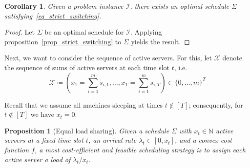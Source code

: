 \documentclass[hidelinks]{article}
\theoremstyle{plain}
\newtheorem{prop}[thm]{Proposition}
\newtheorem{cor}[thm]{Corollary}
\theoremstyle{definition}
\theoremstyle{rem}
\newcommand{\mx}{\mathcal{X}}
\newcommand{\inp}{\mathcal{I}}
\newcommand{\fromto}[2]{\{#1,\ldots,#2\}}
\begin{document}
\begin{cor}
Given a problem instance $\inp$, there exists an optimal schedule $\Sigma$ satisfying~\eqref{eq_strict_switching}.
\end{cor}

\begin{proof}
	Let $\Sigma$ be an optimal schedule for $\inp$. Applying proposition~\ref{prop_strict_switching} to $\Sigma$ yields the result.
\end{proof}

Next, we want to consider the sequence of active servers. For this, let $\mx$ denote the sequence of sums of active servers at each time slot $t$, i.e.\
\begin{equation*}
	\mx\coloneqq(x_1=\sum\limits_{i=1}^{m}s_{i,1},\ldots,x_T=\sum\limits_{i=1}^{m}s_{i,T})\in\fromto{0}{m}^T
\end{equation*}

Recall that we assume all machines sleeping at times $t\notin[T]$; consequently, for $t\notin[T]$ we have $x_t=0$. 

\begin{prop}[Equal load sharing]\label{prop_equ_load_sharing}
Given a schedule $\Sigma$ with $x_t\in\mathbb{N}$ active servers at a fixed time slot $t$, an arrival rate $\lambda_t\in[0,x_t]$, and a convex cost function $f$, a most cost-efficient and feasible scheduling strategy is to assign each active server a load of $\lambda_t/x_t$.
\end{prop}
\end{document}

